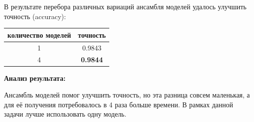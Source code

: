 \documentclass[a4paper, 11pt]{article}
\begin{document}
        В результате перебора различных вариаций ансамбля моделей удалось улучшить точность (accuracy):
        \begin{table}[h]
            \begin{center}
                \begin{tabular}{|c|c|}
                    \hline 
                    количество моделей & точность \\ 
                    \hline 
                    1 & 0.9843 \\ 
                    \hline 
                    4 & \textbf{0.9844} \\ 
                    \hline 
                \end{tabular} 
            \end{center}
       \end{table}
       
       \textbf{Анализ результата:}
       
       Ансамбль моделей помог улучшить точность, но эта разница совсем маленькая, а для её получения потребовалось в 4 раза больше времени. В рамках данной задачи лучше использовать одну модель.
\end{document}
